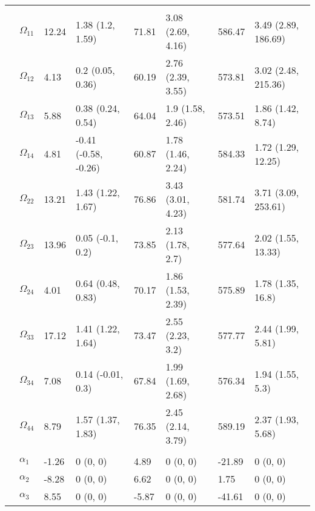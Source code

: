 \documentclass[]{article}
\begin{document}
\begin{table}[t]
\begin{tabular}{llllllll}
\addlinespace[0.3em]
\multicolumn{8}{l}{\textbf{ }}\\
\hspace{1em} & $\Omega_{11}$ & 12.24 & 1.38 (1.2, 1.59) & 71.81 & 3.08 (2.69, 4.16) & 586.47 & 3.49 (2.89, 186.69)\\
\hspace{1em} & $\Omega_{12}$ & 4.13 & 0.2 (0.05, 0.36) & 60.19 & 2.76 (2.39, 3.55) & 573.81 & 3.02 (2.48, 215.36)\\
\hspace{1em} & $\Omega_{13}$ & 5.88 & 0.38 (0.24, 0.54) & 64.04 & 1.9 (1.58, 2.46) & 573.51 & 1.86 (1.42, 8.74)\\
\hspace{1em} & $\Omega_{14}$ & 4.81 & -0.41 (-0.58, -0.26) & 60.87 & 1.78 (1.46, 2.24) & 584.33 & 1.72 (1.29, 12.25)\\
\hspace{1em} & $\Omega_{22}$ & 13.21 & 1.43 (1.22, 1.67) & 76.86 & 3.43 (3.01, 4.23) & 581.74 & 3.71 (3.09, 253.61)\\
\hspace{1em} & $\Omega_{23}$ & 13.96 & 0.05 (-0.1, 0.2) & 73.85 & 2.13 (1.78, 2.7) & 577.64 & 2.02 (1.55, 13.33)\\
\hspace{1em} & $\Omega_{24}$ & 4.01 & 0.64 (0.48, 0.83) & 70.17 & 1.86 (1.53, 2.39) & 575.89 & 1.78 (1.35, 16.8)\\
\hspace{1em} & $\Omega_{33}$ & 17.12 & 1.41 (1.22, 1.64) & 73.47 & 2.55 (2.23, 3.2) & 577.77 & 2.44 (1.99, 5.81)\\
\hspace{1em} & $\Omega_{34}$ & 7.08 & 0.14 (-0.01, 0.3) & 67.84 & 1.99 (1.69, 2.68) & 576.34 & 1.94 (1.55, 5.3)\\
\hspace{1em} & $\Omega_{44}$ & 8.79 & 1.57 (1.37, 1.83) & 76.35 & 2.45 (2.14, 3.79) & 589.19 & 2.37 (1.93, 5.68)\\
\addlinespace[0.3em]
\multicolumn{8}{l}{\textbf{ }}\\
\hspace{1em} & $\alpha_{1}$ & -1.26 & 0 (0, 0) & 4.89 & 0 (0, 0) & -21.89 & 0 (0, 0)\\
\hspace{1em} & $\alpha_{2}$ & -8.28 & 0 (0, 0) & 6.62 & 0 (0, 0) & 1.75 & 0 (0, 0)\\
\hspace{1em} & $\alpha_{3}$ & 8.55 & 0 (0, 0) & -5.87 & 0 (0, 0) & -41.61 & 0 (0, 0)\\

\end{tabular}
\end{table}
\end{document}

